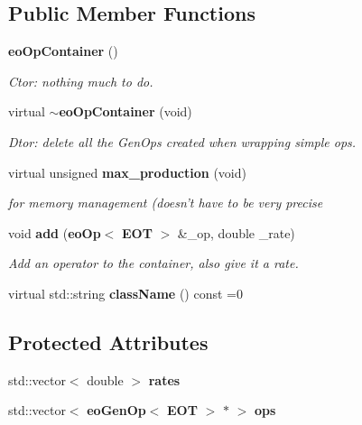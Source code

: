 \subsection*{Public Member Functions}
\begin{CompactItemize}
\item 
{\bf eo\-Op\-Container} ()\label{classeo_op_container_a0}

\begin{CompactList}\small\item\em Ctor: nothing much to do. \item\end{CompactList}\item 
virtual {\bf $\sim$eo\-Op\-Container} (void)\label{classeo_op_container_a1}

\begin{CompactList}\small\item\em Dtor: delete all the Gen\-Ops created when wrapping simple ops. \item\end{CompactList}\item 
virtual unsigned {\bf max\_\-production} (void)\label{classeo_op_container_a2}

\begin{CompactList}\small\item\em for memory management (doesn't have to be very precise \item\end{CompactList}\item 
void {\bf add} ({\bf eo\-Op}$<$ {\bf EOT} $>$ \&\_\-op, double \_\-rate)
\begin{CompactList}\small\item\em Add an operator to the container, also give it a rate. \item\end{CompactList}\item 
virtual std::string {\bf class\-Name} () const =0\label{classeo_op_container_a4}

\end{CompactItemize}
\subsection*{Protected Attributes}
\begin{CompactItemize}
\item 
std::vector$<$ double $>$ {\bf rates}\label{classeo_op_container_p0}

\item 
std::vector$<$ {\bf eo\-Gen\-Op}$<$ {\bf EOT} $>$ $\ast$ $>$ {\bf ops}\label{classeo_op_container_p1}

\end{CompactItemize}
